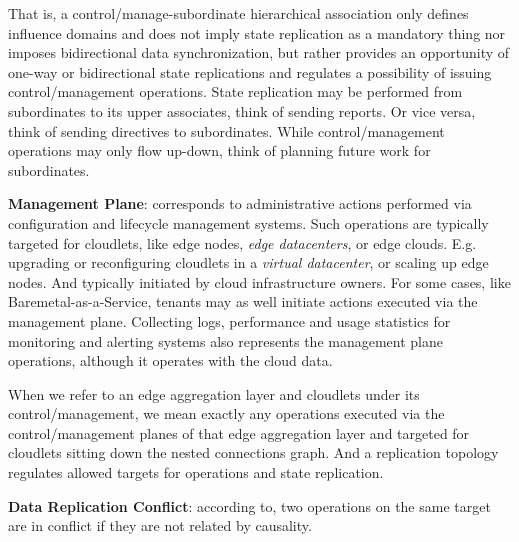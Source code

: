 \documentclass[conference]{IEEEtran}
\begin{document}
That is, a control/manage-subordinate hierarchical association only defines
influence domains and does not imply state replication as a mandatory thing nor
imposes bidirectional data synchronization, but rather provides an opportunity
of one-way or bidirectional state replications and regulates a possibility of
issuing control/management operations. State replication may be performed from
subordinates to its upper associates, think of sending reports. Or vice versa,
think of sending directives to subordinates. While control/management
operations may only flow up-down, think of planning future work for
subordinates.

\textbf{Management Plane}: corresponds to administrative actions performed via
configuration and lifecycle management systems. Such operations are typically
targeted for cloudlets, like edge nodes, \textit{edge datacenters}\cite{b3},
or edge clouds. E.g. upgrading or reconfiguring cloudlets in a \textit{virtual
datacenter}\cite{b3}, or scaling up edge nodes. And typically initiated by
cloud infrastructure owners. For some cases, like Baremetal-as-a-Service,
tenants may as well initiate actions executed via the management plane.
Collecting logs, performance and usage statistics for monitoring and alerting
systems also represents the management plane operations, although it operates
with the cloud data.

When we refer to an edge aggregation layer and cloudlets under its
control/management, we mean exactly any operations executed via the
control/management planes of that edge aggregation layer and targeted for
cloudlets sitting down the nested connections graph. And a replication topology
regulates allowed targets for operations and state replication.

\textbf{Data Replication Conflict}: according to\cite{b1}, two operations on
the same target are in conflict if they are not related by causality.
\end{document}
